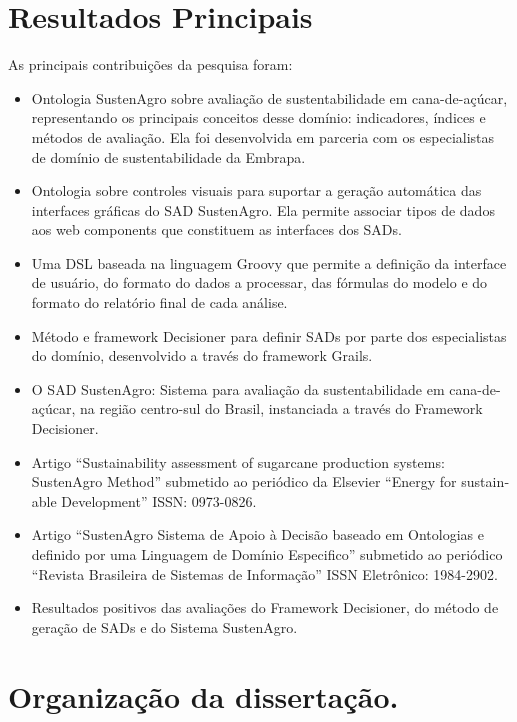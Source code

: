 \section{Resultados Principais}

As principais contribuições da pesquisa foram:
\begin{itemize}
\item Ontologia SustenAgro sobre avaliação de sustentabilidade em cana-de-açúcar,
representando os principais conceitos desse domínio: indicadores,
índices e métodos de avaliação. Ela foi desenvolvida em parceria com
os especialistas de domínio de sustentabilidade da Embrapa.
\item Ontologia sobre controles visuais para suportar a geração automática
das interfaces gráficas do SAD SustenAgro. Ela permite associar tipos
de dados aos \foreignlanguage{english}{web components} que constituem
as interfaces dos SADs.
\item Uma DSL baseada na linguagem \foreignlanguage{english}{Groovy} que
permite a definição da interface de usuário, do formato do dados a
processar, das fórmulas do modelo e do formato do relatório final
de cada análise.
\item Método e framework Decisioner para definir SADs por parte dos especialistas
do domínio, desenvolvido a través do framework \foreignlanguage{english}{Grails}.
\item O SAD SustenAgro: Sistema para avaliação da sustentabilidade em cana-de-açúcar,
na região centro-sul do Brasil, instanciada a través do Framework
Decisioner.
\item Artigo ``\foreignlanguage{english}{Sustainability assessment of sugarcane
production systems: SustenAgro Method}'' submetido ao periódico da
\foreignlanguage{english}{Elsevier} ``\foreignlanguage{english}{Energy
for sustainable Development}'' ISSN: 0973-0826.
\item Artigo ``SustenAgro Sistema de Apoio à Decisão baseado em Ontologias
e definido por uma Linguagem de Domínio Especifico'' submetido ao
periódico ``Revista Brasileira de Sistemas de Informação'' ISSN
Eletrônico: 1984-2902.
\item Resultados positivos das avaliações do Framework Decisioner, do método
de geração de SADs e do Sistema SustenAgro.
\end{itemize}

\section{Organização da dissertação.}

